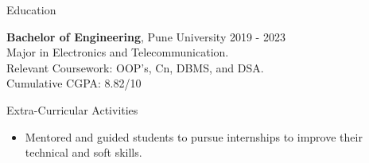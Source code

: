 \documentclass{resume} %
\begin{document}
\begin{rSection}{Education}

{\bf Bachelor of Engineering}, Pune University \hfill {2019 - 2023}\\
Major in Electronics and Telecommunication.\\
Relevant Coursework: OOP's, Cn, DBMS, and DSA.\\
Cumulative CGPA: 8.82/10



\end{rSection}

\begin{rSection}{Extra-Curricular Activities} 
\begin{itemize}
    \item Mentored and guided students to pursue internships to improve their technical and soft skills.
\end{itemize}
\end{rSection}



\end{document}
